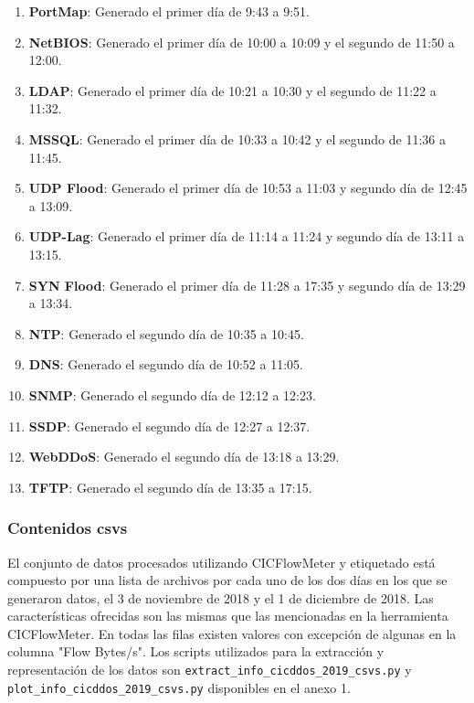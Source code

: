 \begin{enumerate}
    \item \textbf{PortMap}: Generado el primer día de 9:43 a 9:51.
    \item \textbf{NetBIOS}: Generado el primer día de 10:00 a 10:09 y el segundo de 11:50 a 12:00.
    \item \textbf{LDAP}: Generado el primer día de 10:21 a 10:30 y el segundo de 11:22 a 11:32.
    \item \textbf{MSSQL}: Generado el primer día de 10:33 a 10:42 y el segundo de 11:36 a 11:45.
    \item \textbf{UDP Flood}: Generado el primer día de 10:53 a 11:03 y segundo día de 12:45 a 13:09.
    \item \textbf{UDP-Lag}: Generado el primer día de 11:14 a 11:24 y segundo día de 13:11 a 13:15.
    \item \textbf{SYN Flood}: Generado el primer día de 11:28 a 17:35 y segundo día de 13:29 a 13:34.
    \item \textbf{NTP}: Generado el segundo día de 10:35 a 10:45.
    \item \textbf{DNS}: Generado el segundo día de 10:52 a 11:05.
    \item \textbf{SNMP}: Generado el segundo día de 12:12 a 12:23.
    \item \textbf{SSDP}: Generado el segundo día de 12:27 a 12:37.
    \item \textbf{WebDDoS}: Generado el segundo día de 13:18 a 13:29.
    \item \textbf{TFTP}: Generado el segundo día de 13:35 a 17:15.
\end{enumerate}

\subsubsection{Contenidos csvs}

El conjunto de datos procesados utilizando CICFlowMeter y etiquetado está compuesto por una lista de archivos por cada uno de los dos días en los que se generaron datos, el 3 de noviembre de 2018 y el 1 de diciembre de 2018. Las características ofrecidas son las mismas que las mencionadas en la herramienta CICFlowMeter. En todas las filas existen valores con excepción de algunas en la columna "Flow Bytes/s". Los scripts utilizados para la extracción y representación de los datos son \texttt{extract\_info\_cicddos\_2019\_csvs.py} y \texttt{plot\_info\_cicddos\_2019\_csvs.py} disponibles en el anexo 1.

